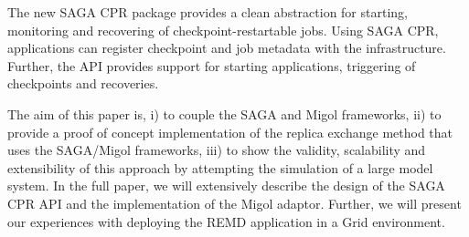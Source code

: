 \documentclass[a4paper,10pt]{article}
\begin{document}
                                                                                                          
The new SAGA CPR package provides a clean abstraction for starting,
monitoring and recovering of checkpoint-restartable jobs.
Using SAGA CPR, applications can register checkpoint and job metadata with the infrastructure. Further, the API provides support for starting applications, triggering of checkpoints and recoveries.

The aim of this paper is, i) to couple the SAGA and Migol
frameworks, ii) to provide a proof of concept implementation of the
replica exchange method that uses the SAGA/Migol frameworks, iii) to show
the validity, scalability and extensibility of this approach by
attempting the simulation of a large model system.
In the full paper, we will extensively  describe the design of the SAGA CPR API and the implementation 
of the Migol adaptor. Further, we will present our experiences with deploying  
the REMD application in a Grid environment.
                                                                    




\end{document}
